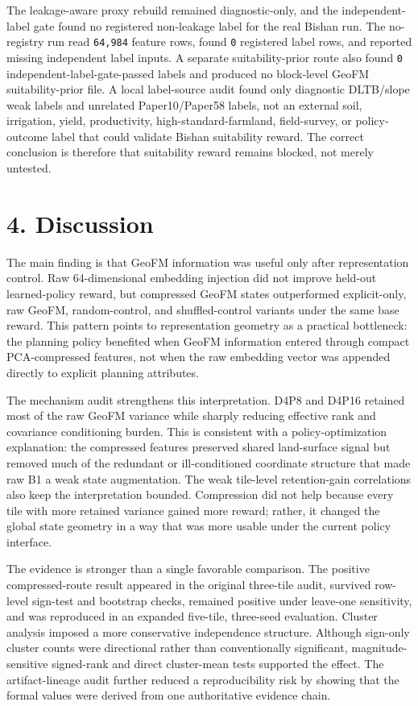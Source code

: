 \documentclass[
  11pt,
  a4paper,
]{article}
\begin{document}
The leakage-aware proxy rebuild remained diagnostic-only, and the
independent-label gate found no registered non-leakage label for the
real Bishan run. The no-registry run read \texttt{64,984} feature rows,
found \texttt{0} registered label rows, and reported missing independent
label inputs. A separate suitability-prior route also found \texttt{0}
independent-label-gate-passed labels and produced no block-level GeoFM
suitability-prior file. A local label-source audit found only diagnostic
DLTB/slope weak labels and unrelated Paper10/Paper58 labels, not an
external soil, irrigation, yield, productivity, high-standard-farmland,
field-survey, or policy-outcome label that could validate Bishan
suitability reward. The correct conclusion is therefore that suitability
reward remains blocked, not merely untested.

\section{4. Discussion}\label{discussion}

The main finding is that GeoFM information was useful only after
representation control. Raw 64-dimensional embedding injection did not
improve held-out learned-policy reward, but compressed GeoFM states
outperformed explicit-only, raw GeoFM, random-control, and
shuffled-control variants under the same base reward. This pattern
points to representation geometry as a practical bottleneck: the
planning policy benefited when GeoFM information entered through compact
PCA-compressed features, not when the raw embedding vector was appended
directly to explicit planning attributes.

The mechanism audit strengthens this interpretation. D4P8 and D4P16
retained most of the raw GeoFM variance while sharply reducing effective
rank and covariance conditioning burden. This is consistent with a
policy-optimization explanation: the compressed features preserved
shared land-surface signal but removed much of the redundant or
ill-conditioned coordinate structure that made raw B1 a weak state
augmentation. The weak tile-level retention-gain correlations also keep
the interpretation bounded. Compression did not help because every tile
with more retained variance gained more reward; rather, it changed the
global state geometry in a way that was more usable under the current
policy interface.

The evidence is stronger than a single favorable comparison. The
positive compressed-route result appeared in the original three-tile
audit, survived row-level sign-test and bootstrap checks, remained
positive under leave-one sensitivity, and was reproduced in an expanded
five-tile, three-seed evaluation. Cluster analysis imposed a more
conservative independence structure. Although sign-only cluster counts
were directional rather than conventionally significant,
magnitude-sensitive signed-rank and direct cluster-mean tests supported
the effect. The artifact-lineage audit further reduced a reproducibility
risk by showing that the formal values were derived from one
authoritative evidence chain.
\end{document}
